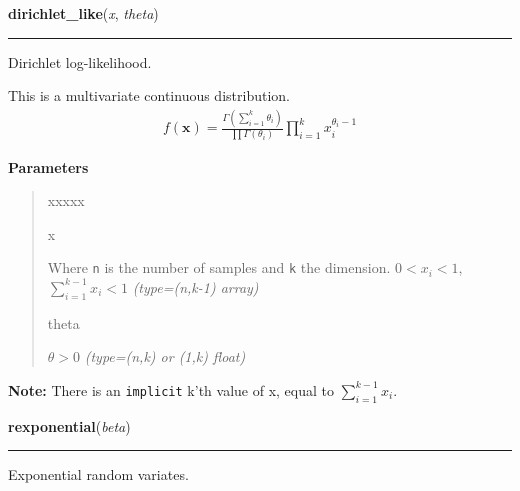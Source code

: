     \begin{boxedminipage}{\textwidth}

    \raggedright \textbf{dirichlet\_like}(\textit{x}, \textit{theta})

    \vspace{-1.5ex}

    \rule{\textwidth}{0.5\fboxrule}

Dirichlet log-likelihood.

This is a multivariate continuous distribution.
\begin{equation*}\begin{split}f(\mathbf{x}) = \frac{\Gamma(\sum_{i=1}^k \theta_i)}{\prod \Gamma(\theta_i)} \prod_{i=1}^k x_i^{\theta_i - 1}\end{split}\end{equation*}    \vspace{1ex}

      \textbf{Parameters}
      \begin{quote}
        \begin{Ventry}{xxxxx}

          \item[x]


Where \texttt{n} is the number of samples and \texttt{k} the dimension.
$0 < x_i < 1$,  $\sum_{i=1}^{k-1} x_i < 1$
            \textit{(type=(n,k-1) array)}

          \item[theta]


$\theta > 0$
            \textit{(type=(n,k) or (1,k) float)}

        \end{Ventry}

      \end{quote}

    \vspace{1ex}

\textbf{Note:} 
There is an \texttt{implicit} k'th value of x, equal to $\sum_{i=1}^{k-1} x_i$.


    \end{boxedminipage}

    \label{pymc:distributions:rexponential}

    \vspace{0.5ex}

    \begin{boxedminipage}{\textwidth}

    \raggedright \textbf{rexponential}(\textit{beta})

    \vspace{-1.5ex}

    \rule{\textwidth}{0.5\fboxrule}

Exponential random variates.
    \vspace{1ex}

    \end{boxedminipage}

